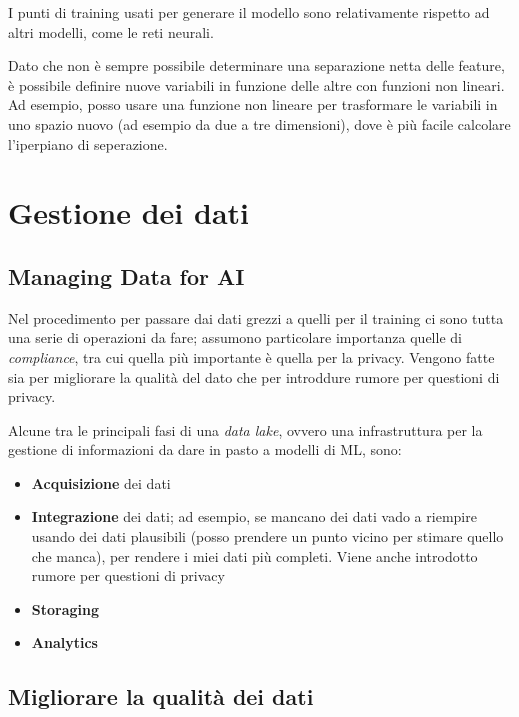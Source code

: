 \documentclass{report}
\begin{document}
\noindent I punti di training usati per generare il modello sono relativamente rispetto ad altri modelli, come le reti neurali.

\noindent Dato che non è sempre possibile determinare una separazione netta delle feature, è possibile definire nuove variabili in funzione delle 
altre con funzioni non lineari. Ad esempio, posso usare una funzione non lineare per trasformare le variabili in uno spazio nuovo (ad esempio 
da due a tre dimensioni), dove è più facile calcolare l'iperpiano di seperazione.





\chapter{Gestione dei dati}

\section{Managing Data for AI}

Nel procedimento per passare dai dati grezzi a quelli per il training ci sono tutta una serie di operazioni da fare; assumono particolare importanza quelle di 
\textit{compliance}, tra cui quella più importante è quella per la privacy. Vengono fatte sia per migliorare la qualità del dato che per introddure 
rumore per questioni di privacy.


\noindent Alcune tra le principali fasi di una \textit{data lake}, ovvero una infrastruttura per la gestione di informazioni da dare in pasto 
a modelli di ML, sono:
\begin{itemize}
    \item \textbf{Acquisizione} dei dati 
    \item \textbf{Integrazione} dei dati; ad esempio, se mancano dei dati vado a riempire usando dei dati plausibili (posso prendere 
    un punto vicino per stimare quello che manca), per rendere i miei dati più completi. Viene anche introdotto rumore per questioni 
    di privacy 
    \item \textbf{Storaging}
    \item \textbf{Analytics}
\end{itemize}

\section{Migliorare la qualità dei dati}
\end{document}
